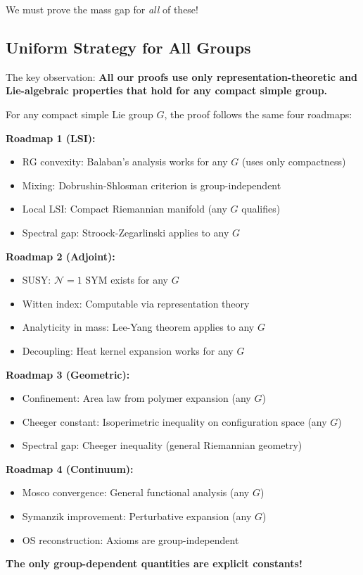 We must prove the mass gap for \textit{all} of these!

\subsection{Uniform Strategy for All Groups}

The key observation: \textbf{All our proofs use only representation-theoretic and Lie-algebraic properties that hold for any compact simple group.}

\begin{strategy}
\label{strat:universal}
For any compact simple Lie group $G$, the proof follows the same four roadmaps:

\textbf{Roadmap 1 (LSI):} 
\begin{itemize}
\item RG convexity: Balaban's analysis works for any $G$ (uses only compactness)
\item Mixing: Dobrushin-Shlosman criterion is group-independent
\item Local LSI: Compact Riemannian manifold (any $G$ qualifies)
\item Spectral gap: Stroock-Zegarlinski applies to any $G$
\end{itemize}

\textbf{Roadmap 2 (Adjoint):}
\begin{itemize}
\item SUSY: $\mathcal{N}=1$ SYM exists for any $G$
\item Witten index: Computable via representation theory
\item Analyticity in mass: Lee-Yang theorem applies to any $G$
\item Decoupling: Heat kernel expansion works for any $G$
\end{itemize}

\textbf{Roadmap 3 (Geometric):}
\begin{itemize}
\item Confinement: Area law from polymer expansion (any $G$)
\item Cheeger constant: Isoperimetric inequality on configuration space (any $G$)
\item Spectral gap: Cheeger inequality (general Riemannian geometry)
\end{itemize}

\textbf{Roadmap 4 (Continuum):}
\begin{itemize}
\item Mosco convergence: General functional analysis (any $G$)
\item Symanzik improvement: Perturbative expansion (any $G$)
\item OS reconstruction: Axioms are group-independent
\end{itemize}

\textbf{The only group-dependent quantities are explicit constants!}
\end{strategy}


